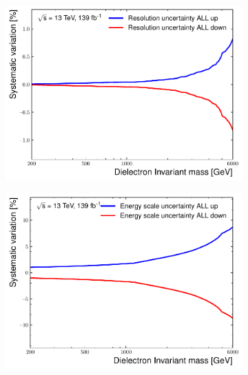 \begin{figure}[]
    \centering
    \begin{subfigure}[b]{0.42\textwidth}
        \centering
        \includegraphics[width=\textwidth]{figures/analysis/datamc/Uncertainties/exp/ee/m_ee_pstOR_EG_RESOLUTION_ALL__1up.pdf}
        \caption{}
        \label{fig:uncert:eeRes}
    \end{subfigure}
    \begin{subfigure}[b]{0.42\textwidth}
        \centering
        \includegraphics[width=\textwidth]{figures/analysis/datamc/Uncertainties/exp/ee/m_ee_pstOR_EG_SCALE_ALL__1up.pdf}
        \caption{}
        \label{fig:uncert:eeScale}
    \end{subfigure}
    \begin{subfigure}[b]{0.42\textwidth}

\end{subfigure}
\end{figure}
